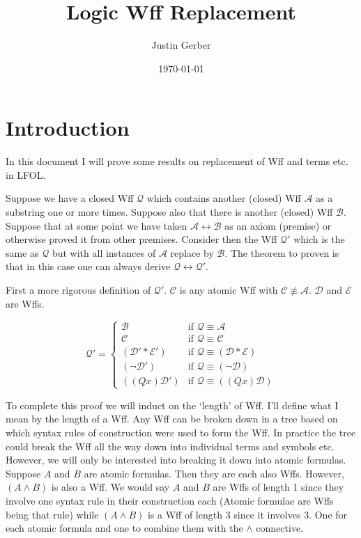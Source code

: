 \documentclass[12pt]{article}
\newcommand{\mc}[1]{\mathcal{#1}}
\begin{document}
\title{Logic Wff Replacement}
\author{Justin Gerber}
\date{\today}
\maketitle

\section{Introduction}
In this document I will prove some results on replacement of Wff and terms etc. in LFOL.

Suppose we have a closed Wff $\mc{Q}$ which contains another (closed) Wff $\mc{A}$ as a substring one or more times. Suppose also that there is another (closed) Wff $\mc{B}$. Suppose that at some point we have taken $\mc{A} \leftrightarrow \mc{B}$ as an axiom (premise) or otherwise proved it from other premises. Consider then the Wff $\mc{Q}'$ which is the same as $\mc{Q}$ but with all instances of $\mc{A}$ replace by $\mc{B}$. The theorem to proven is that in this case one can always derive $\mc{Q} \leftrightarrow \mc{Q}'$.

First a more rigorous definition of $\mc{Q}'$. $\mc{C}$ is any atomic Wff with $\mc{C} \not\equiv \mc{A}$. $\mc{D}$ and $\mc{E}$ are Wffs.

\begin{equation}
\mc{Q}' = 
\begin{cases}
\mc{B} & \text{if } \mc{Q} \equiv \mc{A}\\
\mc{C} & \text{if } \mc{Q} \equiv \mc{C}\\
(\mc{D}' \ast \mc{E}') & \text{if } \mc{Q} \equiv (\mc{D} \ast \mc{E})\\
(\lnot \mc{D}') & \text{if } \mc{Q} \equiv (\lnot \mc{D})\\
((Qx)\mc{D}') & \text{if } \mc{Q} \equiv ((Qx)\mc{D})
\end{cases}
\end{equation}

To complete this proof we will induct on the `length' of Wff. I'll define what I mean by the length of a Wff. Any Wff can be broken down in a tree based on which syntax rules of construction were used to form the Wff. In practice the tree could break the Wff all the way down into individual terms and symbols etc. However, we will only be interested into breaking it down into atomic formulas. Suppose $A$ and $B$ are atomic formulas. Then they are each also Wffs. However, $(A \land B)$ is also a Wff. We would say $A$ and $B$ are Wffs of length 1 since they involve one syntax rule in their construction each (Atomic formulae are Wffs being that rule) while $(A \land B)$ is a Wff of length 3 since it involves 3. One for each atomic formula and one to combine them with the $\land$ connective.
\end{document}
